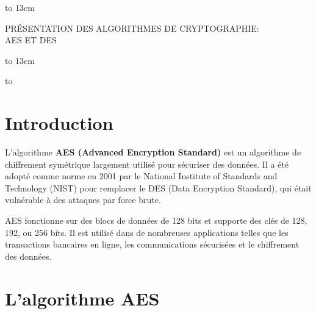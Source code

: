 \documentclass[12pt,a4paper]{article}
\begin{document}
{
\setlength{\topmargin}{-0.5cm}
\begin{titlepage}
  \begin{center}
   \vspace{1cm}
        {}
    
        \vspace{1.2cm}
    \centerline{\hbox to 13cm{\hrulefill}}
    \vspace{0.3cm}
    {\sc \Large  \uppercase{Présentation des algorithmes de cryptographie: \\AES et DES}}
    \centerline{\hbox to 13cm{\hrulefill}}
    
    \vspace{1.2cm}

    \vspace{7cm} 
    \vspace{0.5cm}
    \hbox to \textwidth{\hrulefill}
    \vspace{0.2cm}
    
  \end{center}
\end{titlepage}
}

\maketitle

\tableofcontents %

\newpage

\section{Introduction}
L'algorithme \textbf{AES (Advanced Encryption Standard)} est un algorithme de chiffrement symétrique largement utilisé pour sécuriser des données. Il a été adopté comme norme en 2001 par le National Institute of Standards and Technology (NIST) pour remplacer le DES (Data Encryption Standard), qui était vulnérable à des attaques par force brute.

AES fonctionne sur des blocs de données de 128 bits et supporte des clés de 128, 192, ou 256 bits. Il est utilisé dans de nombreuses applications telles que les transactions bancaires en ligne, les communications sécurisées et le chiffrement des données.

\newpage

\section{L'algorithme AES}
\end{document}
